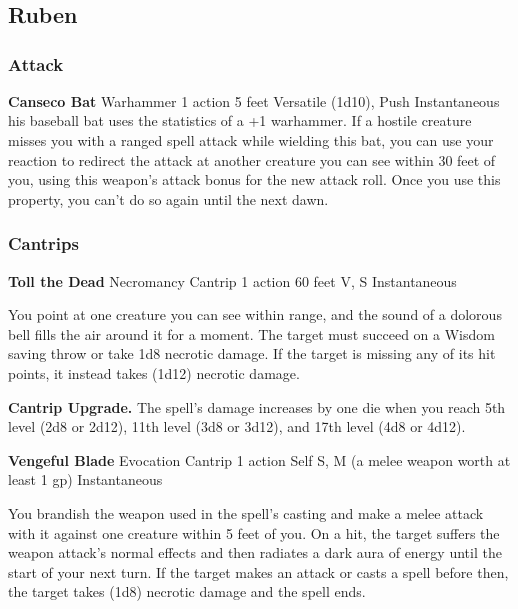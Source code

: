 \chapter*{}

\section{Ruben}

\subsection {Attack}
\DndSpellHeader%
  {\textbf{Canseco Bat}}
  {Warhammer}
  {1 action}
  {5 feet}
  {Versatile (1d10), Push}
  {Instantaneous}
his baseball bat uses the statistics of a +1 warhammer. 
If a hostile creature misses you with a ranged spell attack while wielding this bat, you can use your reaction to redirect the attack at another creature you can see within 30 feet of you, using this weapon’s attack bonus for the new attack roll. 
Once you use this property, you can’t do so again until the next dawn.


\subsection {Cantrips}
\DndSpellHeader%
  {\textbf{Toll the Dead}}
  {Necromancy Cantrip}
  {1 action}
  {60 feet}
  {V, S}
  {Instantaneous}
  
You point at one creature you can see within range, and the sound of a dolorous bell fills the air around it for a moment. The target must succeed on a Wisdom saving throw or take 1d8 necrotic damage. If the target is missing any of its hit points, it instead takes (1d12) necrotic damage.

{\textbf{Cantrip Upgrade.}} The spell’s damage increases by one die when you reach 5th level (2d8 or 2d12), 11th level (3d8 or 3d12), and 17th level (4d8 or 4d12).


\DndSpellHeader%
{\textbf{Vengeful Blade}}
{Evocation Cantrip}
{1 action}
{Self}
{S, M (a melee weapon worth at least 1 gp)}
{Instantaneous}

You brandish the weapon used in the spell’s casting and make a melee attack with it against one creature within 5 feet of you. On a hit, the target suffers the weapon attack’s normal effects and then radiates a dark aura of energy until the start of your next turn. If the target makes an attack or casts a spell before then, the target takes (1d8) necrotic damage and the spell ends.

